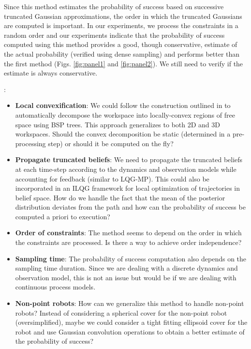\documentclass[letterpaper]{article}
\begin{document}
Since this method estimates the probability of success based on successive truncated Gaussian approximations, the order in which the truncated Gaussians are computed is important. In our experiments, we process the constraints in a random order and our experiments indicate that the probability of success computed using this method provides a good, though conservative, estimate of the actual probability (verified using dense sampling) and performs better than the first method (Figs. \ref{fig:panel1} and \ref{fig:panel2}). We still need to verify if the estimate is always conservative.

\vspace{10pt}
: 

\begin{itemize}
\item {\bf{Local convexification}}: We could follow the construction outlined in \cite{Comba03} to automatically decompose the workspace into locally-convex regions of free space using BSP trees. This approach generalizes to both 2D and 3D workspaces. Should the convex decomposition be static (determined in a pre-processing step) or should it be computed on the fly?
\item {\bf{Propagate truncated beliefs}}: We need to propagate the truncated beliefs at each time-step according to the dynamics and observation models while accounting for feedback (similar to LQG-MP). This could also be incorporated in an ILQG framework for local optimization of trajectories in belief space. How do we handle the fact that the mean of the posterior distribution deviates from the path and how can the probability of success be computed a priori to execution?
\item {\bf{Order of constraints}}: The method seems to depend on the order in which the constraints are processed. Is there a way to achieve order independence?
\item {\bf{Sampling time}}: The probability of success computation also depends on the sampling time duration. Since we are dealing with a discrete dynamics and observation model, this is not an issue but would be if we are dealing with continuous process models.
\item {\bf{Non-point robots}}: How can we generalize this method to handle non-point robots? Instead of considering a spherical cover for the non-point robot (oversimplified), maybe we could consider a tight fitting ellipsoid cover for the robot and use Gaussian convolution operations to obtain a better estimate of the probability of success?
\end{itemize}
\end{document}
